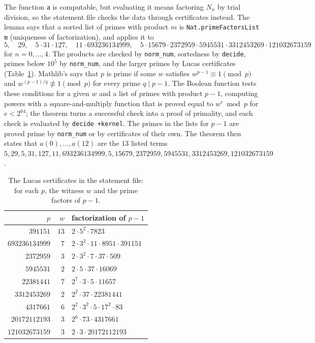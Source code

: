 \documentclass[11pt]{amsart}
\theoremstyle{plain}
\theoremstyle{definition}
\begin{document}
The function \texttt{a} is computable, but evaluating it means factoring $N_n$ by trial division, so the statement file checks the data through certificates instead.
The lemma  says that a sorted list of primes with product $m$ is \texttt{Nat.primeFactorsList m} (uniqueness of factorization), and  applies it to
\[
  5,\quad 29,\quad 5\cdot31\cdot127,\quad 11\cdot 693236134999,\quad 5\cdot15679\cdot2372959\cdot5945531\cdot3312453269\cdot121032673159
\]
for $n=0,\dots,4$. The products are checked by \texttt{norm\_num}, sortedness by \texttt{decide}, primes below $10^5$ by \texttt{norm\_num}, and the larger primes by Lucas certificates (Table~\ref{tab:lucas}).
Mathlib's  says that $p$ is prime if some $w$ satisfies $w^{p-1}\equiv1\pmod p$ and $w^{(p-1)/q}\not\equiv1\pmod p$ for every prime $q\mid p-1$.
The Boolean function  tests these conditions for a given $w$ and a list of primes with product $p-1$, computing powers with a square-and-multiply function  that is proved equal to $w^e\bmod p$ for $e<2^{64}$; the theorem  turns a successful check into a proof of primality, and each check is evaluated by \texttt{decide +kernel}.
The primes in the lists for $p-1$ are proved prime by \texttt{norm\_num} or by certificates of their own.
The theorem  then states that $a(0),\dots,a(12)$ are the $13$ listed terms $5, 29, 5, 31, 127, 11, 693236134999, 5, 15679, 2372959, 5945531, 3312453269, 121032673159$.

\begin{table}[h]
\centering\small
\begin{tabular}{rrl}
\toprule
$p$ & $w$ & factorization of $p-1$\\
\midrule
$391151$ & $13$ & $2\cdot5^2\cdot7823$\\
$693236134999$ & $7$ & $2\cdot3^2\cdot11\cdot8951\cdot391151$\\
$2372959$ & $3$ & $2\cdot3^2\cdot7\cdot37\cdot509$\\
$5945531$ & $2$ & $2\cdot5\cdot37\cdot16069$\\
$22381441$ & $7$ & $2^7\cdot3\cdot5\cdot11657$\\
$3312453269$ & $2$ & $2^2\cdot37\cdot22381441$\\
$4317661$ & $6$ & $2^2\cdot3^2\cdot5\cdot17^2\cdot83$\\
$20172112193$ & $3$ & $2^6\cdot73\cdot4317661$\\
$121032673159$ & $3$ & $2\cdot3\cdot20172112193$\\
\bottomrule
\end{tabular}
\caption{The Lucas certificates in the statement file: for each $p$, the witness $w$ and the prime factors of $p-1$.}
\label{tab:lucas}
\end{table}
\end{document}
